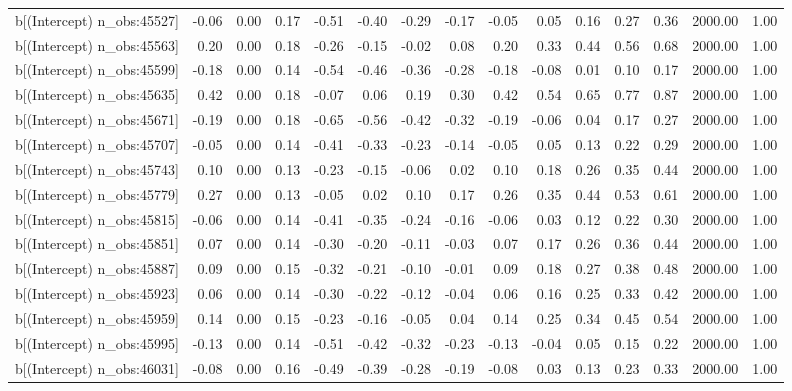 \begin{table}[ht]
\begin{tabular}{rrrrrrrrrrrrrrr}
  b[(Intercept) n\_obs:45527] & -0.06 & 0.00 & 0.17 & -0.51 & -0.40 & -0.29 & -0.17 & -0.05 & 0.05 & 0.16 & 0.27 & 0.36 & 2000.00 & 1.00 \\ 
  b[(Intercept) n\_obs:45563] & 0.20 & 0.00 & 0.18 & -0.26 & -0.15 & -0.02 & 0.08 & 0.20 & 0.33 & 0.44 & 0.56 & 0.68 & 2000.00 & 1.00 \\ 
  b[(Intercept) n\_obs:45599] & -0.18 & 0.00 & 0.14 & -0.54 & -0.46 & -0.36 & -0.28 & -0.18 & -0.08 & 0.01 & 0.10 & 0.17 & 2000.00 & 1.00 \\ 
  b[(Intercept) n\_obs:45635] & 0.42 & 0.00 & 0.18 & -0.07 & 0.06 & 0.19 & 0.30 & 0.42 & 0.54 & 0.65 & 0.77 & 0.87 & 2000.00 & 1.00 \\ 
  b[(Intercept) n\_obs:45671] & -0.19 & 0.00 & 0.18 & -0.65 & -0.56 & -0.42 & -0.32 & -0.19 & -0.06 & 0.04 & 0.17 & 0.27 & 2000.00 & 1.00 \\ 
  b[(Intercept) n\_obs:45707] & -0.05 & 0.00 & 0.14 & -0.41 & -0.33 & -0.23 & -0.14 & -0.05 & 0.05 & 0.13 & 0.22 & 0.29 & 2000.00 & 1.00 \\ 
  b[(Intercept) n\_obs:45743] & 0.10 & 0.00 & 0.13 & -0.23 & -0.15 & -0.06 & 0.02 & 0.10 & 0.18 & 0.26 & 0.35 & 0.44 & 2000.00 & 1.00 \\ 
  b[(Intercept) n\_obs:45779] & 0.27 & 0.00 & 0.13 & -0.05 & 0.02 & 0.10 & 0.17 & 0.26 & 0.35 & 0.44 & 0.53 & 0.61 & 2000.00 & 1.00 \\ 
  b[(Intercept) n\_obs:45815] & -0.06 & 0.00 & 0.14 & -0.41 & -0.35 & -0.24 & -0.16 & -0.06 & 0.03 & 0.12 & 0.22 & 0.30 & 2000.00 & 1.00 \\ 
  b[(Intercept) n\_obs:45851] & 0.07 & 0.00 & 0.14 & -0.30 & -0.20 & -0.11 & -0.03 & 0.07 & 0.17 & 0.26 & 0.36 & 0.44 & 2000.00 & 1.00 \\ 
  b[(Intercept) n\_obs:45887] & 0.09 & 0.00 & 0.15 & -0.32 & -0.21 & -0.10 & -0.01 & 0.09 & 0.18 & 0.27 & 0.38 & 0.48 & 2000.00 & 1.00 \\ 
  b[(Intercept) n\_obs:45923] & 0.06 & 0.00 & 0.14 & -0.30 & -0.22 & -0.12 & -0.04 & 0.06 & 0.16 & 0.25 & 0.33 & 0.42 & 2000.00 & 1.00 \\ 
  b[(Intercept) n\_obs:45959] & 0.14 & 0.00 & 0.15 & -0.23 & -0.16 & -0.05 & 0.04 & 0.14 & 0.25 & 0.34 & 0.45 & 0.54 & 2000.00 & 1.00 \\ 
  b[(Intercept) n\_obs:45995] & -0.13 & 0.00 & 0.14 & -0.51 & -0.42 & -0.32 & -0.23 & -0.13 & -0.04 & 0.05 & 0.15 & 0.22 & 2000.00 & 1.00 \\ 
  b[(Intercept) n\_obs:46031] & -0.08 & 0.00 & 0.16 & -0.49 & -0.39 & -0.28 & -0.19 & -0.08 & 0.03 & 0.13 & 0.23 & 0.33 & 2000.00 & 1.00 \\ 

\end{tabular}
\end{table}
